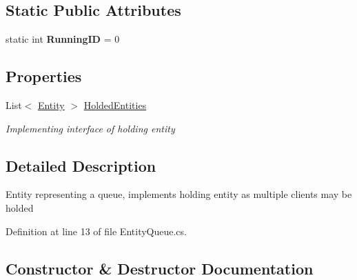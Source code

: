 \subsection*{Static Public Attributes}
\begin{DoxyCompactItemize}
\item 
static int {\bfseries Running\+ID} = 0\hypertarget{class_simple_queue_example_1_1_model_elements_1_1_entity_queue_a64cad4bfb437a05ee02aa07910f6c579}{}\label{class_simple_queue_example_1_1_model_elements_1_1_entity_queue_a64cad4bfb437a05ee02aa07910f6c579}

\end{DoxyCompactItemize}
\subsection*{Properties}
\begin{DoxyCompactItemize}
\item 
List$<$ \hyperlink{class_simulation_core_1_1_h_c_c_m_elements_1_1_entity}{Entity} $>$ \hyperlink{class_simple_queue_example_1_1_model_elements_1_1_entity_queue_abd104d57ebeac47161edc205522a157e}{Holded\+Entities}
\begin{DoxyCompactList}\small\item\em Implementing interface of holding entity \end{DoxyCompactList}\end{DoxyCompactItemize}


\subsection{Detailed Description}
Entity representing a queue, implements holding entity as multiple clients may be holded 



Definition at line 13 of file Entity\+Queue.\+cs.



\subsection{Constructor \& Destructor Documentation}
